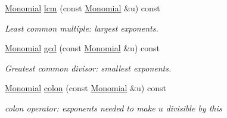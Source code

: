 \begin{Indent}
\begin{DoxyCompactItemize}
\hyperlink{group__polygroup_class_monomial}{Monomial} \hyperlink{group__polygroup_a168381ee5e477d90f59dec9f26b24cc6}{lcm} (const \hyperlink{group__polygroup_class_monomial}{Monomial} \&u) const
\begin{DoxyCompactList}\small\item\em Least common multiple\+: largest exponents. \end{DoxyCompactList}\item 
\mbox{\label{group__polygroup_a3595c980636363b0e30b4777d76e49a6}} 
\hyperlink{group__polygroup_class_monomial}{Monomial} \hyperlink{group__polygroup_a3595c980636363b0e30b4777d76e49a6}{gcd} (const \hyperlink{group__polygroup_class_monomial}{Monomial} \&u) const
\begin{DoxyCompactList}\small\item\em Greatest common divisor\+: smallest exponents. \end{DoxyCompactList}\item 
\mbox{\label{group__polygroup_ae9e3375ea8144c587957d34979709310}} 
\hyperlink{group__polygroup_class_monomial}{Monomial} \hyperlink{group__polygroup_ae9e3375ea8144c587957d34979709310}{colon} (const \hyperlink{group__polygroup_class_monomial}{Monomial} \&u) const
\begin{DoxyCompactList}\small\item\em colon operator\+: exponents needed to make $u$ divisible by {\ttfamily this} \end{DoxyCompactList}\end{DoxyCompactItemize}
\end{Indent}
